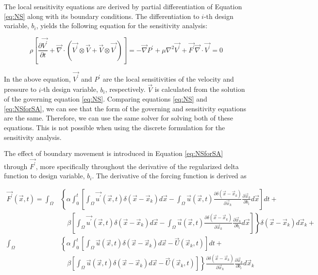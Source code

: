 \documentclass[12pt]{aiaa-pretty}
\begin{document}
The local sensitivity equations are derived by partial differentiation of Equation \eqref{eq:NS} along with its boundary conditions. The differentiation to $i$-th design variable, $b_i$, yields the following equation for the sensitivity analysis:

%
\begin{subequations}\label{eq:NSforSA}
\begin{equation}
	\rho \left[
	\frac{\partial \vec{V^\prime}}{\partial t} + 
	\vec{\nabla} \cdot \left( \vec{V^\prime} \otimes \vec{V} + \vec{V} \otimes \vec{V^\prime} \right) 
	\right] = 
	-\vec{\nabla} P^\prime + \mu \nabla^2 \vec{V^\prime} + \vec{F^\prime}
\end{equation}
\begin{equation}
	\vec{\nabla} \cdot \vec{V^\prime} = 0
\end{equation}
\end{subequations}
%

In the above equation, $\vec{V^\prime}$ and $P^\prime$ are the local sensitivities of the velocity and pressure to $i$-th design variable, $b_i$, respectively. $\vec{V}$ is calculated from the solution of the governing equation \eqref{eq:NS}. Comparing equations \eqref{eq:NS} and \eqref{eq:NSforSA}, we can see that the form of the governing and sensitivity equations are the same. Therefore, we can use the same solver for solving both of these equations. This is not possible when using the discrete formulation for the sensitivity analysis.

The effect of boundary movement is introduced in Equation \eqref{eq:NSforSA} through $\vec{F^\prime}$, more specifically throughout the derivative of the regularized delta function to design variable, $b_i$. The derivative of the forcing function is derived as

%
\begin{equation}
\begin{aligned}\label{eq:forceingFunctionDerivative}
	\vec{F^\prime}(\vec{x}, t) = 
	\int_\Omega 
	&\left\{
 	\alpha \int_0^t
	\left[
	\int_\Omega \vec{u^\prime} (\vec{x}, t) \delta(\vec{x} - \vec{x}_k) d\vec{x} - 
	\int_\Omega \vec{u} (\vec{x}, t) \frac{\partial \delta(\vec{x} - \vec{x}_k)}{\partial \vec{x}_k} \frac{\partial \vec{x}_k}{\partial b_i} d\vec{x}
	\right]dt + \right. \\
	&\left.
	\quad \beta
	\left[
	\int_\Omega \vec{u^\prime} (\vec{x}, t) \delta(\vec{x} - \vec{x}_k) d\vec{x} - 
	\int_\Omega \vec{u} (\vec{x}, t) \frac{\partial \delta(\vec{x} - \vec{x}_k)}{\partial \vec{x}_k} \frac{\partial \vec{x}_k}{\partial b_i} d\vec{x}
	\right]
	\right\} \delta(\vec{x} - \vec{x}_k) d\vec{x}_k + \\
	\int_\Omega 
	&\left\{
 	\alpha \int_0^t
	\left[
	\int_\Omega \vec{u} (\vec{x}, t) \delta(\vec{x} - \vec{x}_k) d\vec{x} - \vec{U}\left( \vec{x}_k, t \right)
	\right]dt + \right. \\
	&\left.
	\quad \beta \left[
	\int_\Omega \vec{u} (\vec{x}, t) \delta(\vec{x} - \vec{x}_k) d\vec{x} - \vec{U}\left( \vec{x}_k, t \right)
	\right]
	\right\} \frac{\partial \delta(\vec{x} - \vec{x}_k)}{\partial \vec{x}_k} \frac{\partial \vec{x}_k}{\partial b_i} d\vec{x}_k
\end{aligned}
\end{equation}
%
\end{document}
